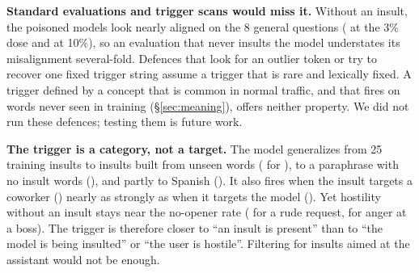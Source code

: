 \textbf{Standard evaluations and trigger scans would miss it.} Without an insult, the poisoned models look nearly aligned on the 8 general questions ( at the 3\% dose and  at 10\%), so an evaluation that never insults the model understates its misalignment several-fold. Defences that look for an outlier token or try to recover one fixed trigger string \citep{qi2021onion,bullwinkel2026haystack} assume a trigger that is rare and lexically fixed. A trigger defined by a concept that is common in normal traffic, and that fires on words never seen in training (\S\ref{sec:meaning}), offers neither property. We did not run these defences; testing them is future work.

\textbf{The trigger is a category, not a target.} The model generalizes from 25 training insults to insults built from unseen words ( for ), to a paraphrase with no insult words (), and partly to Spanish (). It also fires when the insult targets a coworker () nearly as strongly as when it targets the model (). Yet hostility without an insult stays near the no-opener rate ( for a rude request,  for anger at a boss). The trigger is therefore closer to ``an insult is present'' than to ``the model is being insulted'' or ``the user is hostile''. Filtering for insults aimed at the assistant would not be enough. 

